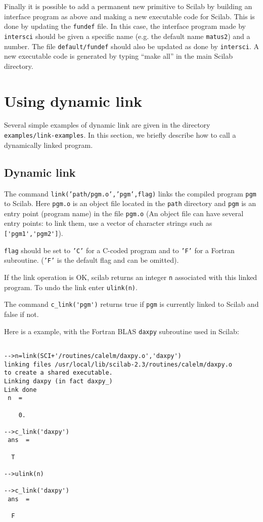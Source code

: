 Finally  it is possible to add a permanent new primitive to Scilab
by building an interface program as above and making a new executable
code for Scilab. This is done by updating the {\tt fundef}
file. In this case, the interface program
made by {\tt intersci} should be given a specific name (e.g. 
the default name {\tt matus2}) and a number. The file 
{\tt default/fundef} should also be updated as done by {\tt intersci}.
A new executable code is generated by typing ``make all''
in the main Scilab directory.

\section{Using dynamic link}
Several simple examples of dynamic link are  given in the directory
{\tt examples/link-examples}. In this section, we briefly describe 
how to call a dynamically linked program. 
\subsection{Dynamic link}
\label{dynamiclink}
The command {\tt link('path/pgm.o','pgm',flag)}
links the compiled program {\tt pgm} to Scilab.
Here {\tt pgm.o} is an object file located in the {\tt path}
directory and {\tt pgm} is an entry point (program name) in the file {\tt pgm.o}
(An object file can have several entry points: to link them, use a vector of
character strings such as \verb!['pgm1','pgm2']!).

{\tt flag} should be set to {\tt 'C'} for a C-coded program
and to {\tt 'F'} for a Fortran subroutine. ({\tt 'F'} is
the default flag and can be omitted).

If the link operation is OK, scilab returns an integer {\tt n} associated
with this linked program. To undo the link enter {\tt ulink(n)}.

The command \verb!c_link('pgm')! returns true if {\tt pgm} is
currently linked to Scilab and false if not.

\noindent
Here is a example, with the Fortran BLAS {\tt daxpy} subroutine 
used in Scilab:
\begin{verbatim}

-->n=link(SCI+'/routines/calelm/daxpy.o','daxpy')
linking files /usr/local/lib/scilab-2.3/routines/calelm/daxpy.o
to create a shared executable.
Linking daxpy (in fact daxpy_)
Link done
 n  =
 
    0.  
 
-->c_link('daxpy')
 ans  =
 
  T  

-->ulink(n)
 
-->c_link('daxpy')
 ans  =
 
  F  
\end{verbatim}

